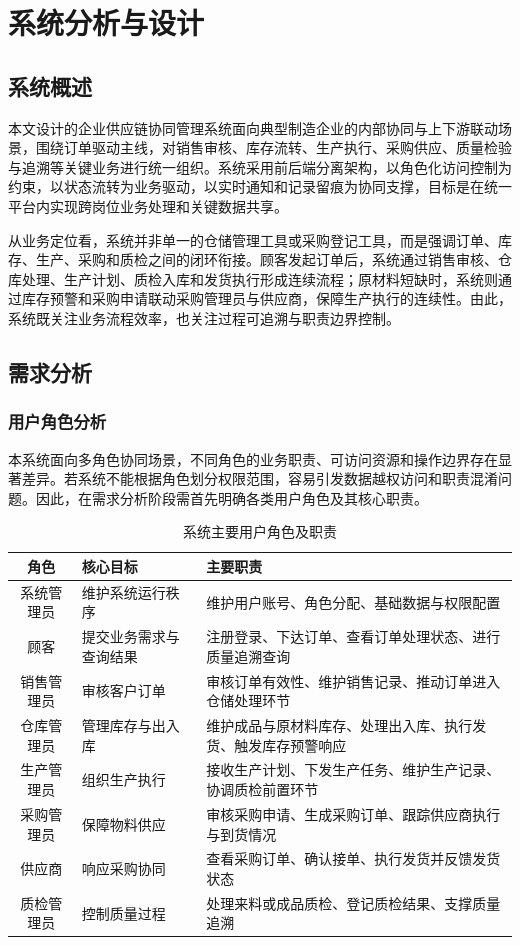 \chapter{系统分析与设计}

\section{系统概述}

本文设计的企业供应链协同管理系统面向典型制造企业的内部协同与上下游联动场景，围绕订单驱动主线，对销售审核、库存流转、生产执行、采购供应、质量检验与追溯等关键业务进行统一组织。系统采用前后端分离架构，以角色化访问控制为约束，以状态流转为业务驱动，以实时通知和记录留痕为协同支撑，目标是在统一平台内实现跨岗位业务处理和关键数据共享。

从业务定位看，系统并非单一的仓储管理工具或采购登记工具，而是强调订单、库存、生产、采购和质检之间的闭环衔接。顾客发起订单后，系统通过销售审核、仓库处理、生产计划、质检入库和发货执行形成连续流程；原材料短缺时，系统则通过库存预警和采购申请联动采购管理员与供应商，保障生产执行的连续性。由此，系统既关注业务流程效率，也关注过程可追溯与职责边界控制。

\section{需求分析}

\subsection{用户角色分析}

本系统面向多角色协同场景，不同角色的业务职责、可访问资源和操作边界存在显著差异。若系统不能根据角色划分权限范围，容易引发数据越权访问和职责混淆问题。因此，在需求分析阶段需首先明确各类用户角色及其核心职责。

\begin{table}[htbp]
\centering
\footnotesize
\caption{系统主要用户角色及职责}
\label{tab:roles}
\begin{tabular}{|c|p{4.0cm}|p{6.8cm}|}
\hline
角色 & 核心目标 & 主要职责 \\\hline
系统管理员 & 维护系统运行秩序 & 维护用户账号、角色分配、基础数据与权限配置 \\\hline
顾客 & 提交业务需求与查询结果 & 注册登录、下达订单、查看订单处理状态、进行质量追溯查询 \\\hline
销售管理员 & 审核客户订单 & 审核订单有效性、维护销售记录、推动订单进入仓储处理环节 \\\hline
仓库管理员 & 管理库存与出入库 & 维护成品与原材料库存、处理出入库、执行发货、触发库存预警响应 \\\hline
生产管理员 & 组织生产执行 & 接收生产计划、下发生产任务、维护生产记录、协调质检前置环节 \\\hline
采购管理员 & 保障物料供应 & 审核采购申请、生成采购订单、跟踪供应商执行与到货情况 \\\hline
供应商 & 响应采购协同 & 查看采购订单、确认接单、执行发货并反馈发货状态 \\\hline
质检管理员 & 控制质量过程 & 处理来料或成品质检、登记质检结果、支撑质量追溯 \\\hline
\end{tabular}
\end{table}

